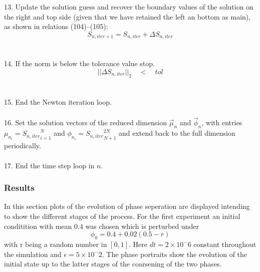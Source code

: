 \documentclass{article}
\begin{document}
13. Update the solution guess and recover the boundary values of the solution on the right and top side (given that we have retained the left an bottom as main), as shown in relations (104)--(105):\\
\begin{equation}
S_{n,iter+1} = S_{n,iter} + \Delta S_{n,iter}
\end{equation}\\\\

14. If the norm is below the tolerance value stop.\begin{equation}
||\Delta S_{n,iter}||_2 \quad < \quad tol
\end{equation} \\\\

15. End the Newton iteration loop.\\\\

16. Set the solution vectors of the reduced dimension $\vec{\mu}_n$ and $\vec{\phi}_n$, with entries $\mu_{n_i} = {S_{n,iter}}_{i=1}^N$ and $\phi_{n_i} = {S_{n,iter}}_{N+1}^{2N}$ and extend back to the full dimension periodically.\\\\


17. End the time step loop in $n$.
\subsubsection{Results}

In this section plots of the evolution of phase seperation are displayed intending to show the different stages of the process. For the first experiment an initial conditition with mean $0.4$ was chosen which is perturbed under 
\begin{equation}
\phi_0 = 0.4 + 0.02(0.5-r)
\end{equation}
with r being a random number in $[0,1]$. Here $dt=2\times10^-6$ constant throughout the simulation and $\epsilon = 5\times10^-2$. The phase portraits show the evolution of the initial state up to the latter stages of the coarsening of the two phases.
\end{document}
